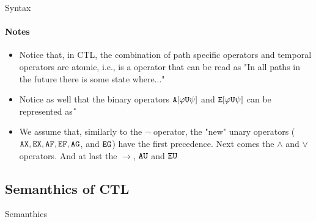 \begin{frame}{Syntax}
	\framesubtitle{Notes}
	\begin{itemize}
		\item 
		{
			Notice that, in CTL, the combination of path specific operators and temporal operators are atomic, i.e., \A\F \; is a operator that can be read as "In all paths in the future there is some state where..."
		}
		
		\item 
		{
			Notice as well that the binary operators $\texttt{A}[\varphi\texttt{U}\psi]$ and $\texttt{E}[\varphi\texttt{U}\psi]$ can be represented as \A\U
		}
		
		\item 
		{
			We assume that, similarly to the $\neg$ operator, the "new" unary operators ($\texttt{A}\texttt{X}, \texttt{E}\texttt{X}, \texttt{A}\texttt{F}, \texttt{E}\texttt{F}, \texttt{A}\texttt{G} $, and $ \texttt{E}\texttt{G} $) have the first precedence. Next comes the $\land$ and $\lor$ operators. And at last the $\to$, $\texttt{A}\texttt{U}$ and $\texttt{E}\texttt{U}$
		}
	\end{itemize}
	
\end{frame}

\subsection{Semanthics of CTL}
\begin{frame}{Semanthics}
	
\end{frame}